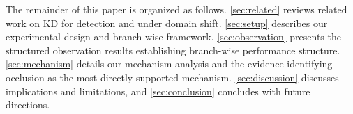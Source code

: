 The remainder of this paper is organized as follows. \cref{sec:related} reviews related work on KD for detection and under domain shift. \cref{sec:setup} describes our experimental design and branch-wise framework. \cref{sec:observation} presents the structured observation results establishing branch-wise performance structure. \cref{sec:mechanism} details our mechanism analysis and the evidence identifying occlusion as the most directly supported mechanism. \cref{sec:discussion} discusses implications and limitations, and \cref{sec:conclusion} concludes with future directions.
